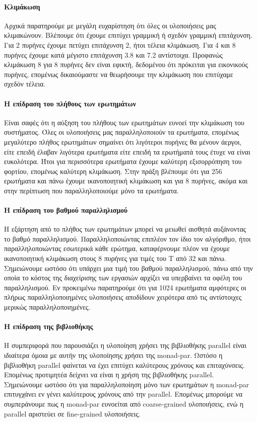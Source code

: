 \documentclass[titlepage]{article}
\begin{document}
\paragraph{Κλιμάκωση}

Αρχικά παρατηρούμε με μεγάλη ευχαρίστηση ότι όλες οι υλοποιήσεις μας κλιμακώνουν. Βλέπουμε ότι έχουμε επιτύχει γραμμική ή σχεδόν γραμμική επιτάχυνση. Για 2 πυρήνες έχουμε πετύχει επιτάχυνση 2, ήτοι τέλεια κλιμάκωση. Για 4 και 8 πυρήνες έχουμε κατά μέγιστο επιτάχυνση 3.8 και 7.2 αντίστοιχα. Προφανώς κλιμάκωση 8 για 8 πυρήνες δεν είναι εφικτή, δεδομένου ότι πρόκειται για εικονικούς πυρήνες, επομένως δικαιούμαστε να θεωρήσουμε την κλιμάκωση που επιτύχαμε σχεδόν τέλεια.

\paragraph{Η επίδραση του πλήθους των ερωτημάτων}

Είναι σαφές ότι η αύξηση του πλήθους των ερωτημάτων ευνοεί την κλιμάκωση του συστήματος. Όλες οι υλοποιήσεις μας παραλληλοποιούν τα ερωτήματα, επομένως μεγαλύτερο πλήθος ερωτημάτων σημαίνει ότι λιγότεροι πυρήνες θα μένουν άεργοι, είτε επειδή έλαβαν λιγότερα ερωτήματα είτε επειδή τα ερωτήματά τους έτυχε να είναι ευκολότερα. Ήτοι για περισσότερα ερωτήματα έχουμε καλύτερη εξισορρόπηση του φορτίου, επομένως καλύτερη κλιμάκωση. Στην πράξη βλέπουμε ότι για 256 ερωτήματα και πάνω έχουμε ικανοποιητική κλιμάκωση και για 8 πυρήνες, ακόμα και στην περίπτωση που παραλληλοποιούμε μόνο τα ερωτήματα.

\paragraph{Η επίδραση του βαθμού παραλληλισμού}

Η εξάρτηση από το πλήθος των ερωτημάτων μπορεί να μειωθεί αισθητά αυξάνοντας το βαθμό παραλληλισμού. Παραλληλοποιώντας επιπλέον τον ίδιο τον αλγόριθμο, ήτοι παραλληλοποιώντας εσωτερικά κάθε ερώτημα, καταφέρνουμε πλέον να έχουμε ικανοποιητική κλιμάκωση στους 8 πυρήνες για τιμές του T από 32 και πάνω. Σημειώνουμε ωστόσο ότι υπάρχει μια τιμή του βαθμού παραλληλισμού, πάνω από την οποία το κόστος της διαχείρισης των εργασιών αρχίζει να υπερβαίνει τα οφέλη του παραλληλισμού. Εν προκειμένω παρατηρούμε ότι για 1024 ερωτήματα αμφότερες οι πλήρως παραλληλοποιημένες υλοποιήσεις αποδίδουν χειρότερα από τις αντίστοιχες μερικώς παραλληλοποιημένες.

\paragraph{Η επίδραση της βιβλιοθήκης}

Η συμπεριφορά που παρουσιάζει η υλοποίηση χρήσει της βιβλιοθήκης parallel είναι ιδιαίτερα όμοια με αυτήν της υλοποίησης χρήσει της monad-par. Ωστόσο η βιβλιοθήκη parallel φαίνεται να έχει επιτύχει καλύτερους χρόνους και επιταχύνσεις. Επομένως προτιμητέα δείχνει να είναι η χρήση της βιβλιοθήκης parallel. Σημειώνουμε ωστόσο ότι για παραλληλοποίηση μόνο των ερωτημάτων η monad-par επιτυγχάνει εν γένει καλύτερους χρόνους από την parallel. Επομένως μπορούμε να συμπεράνουμε πως η monad-par ευνοείται από coarse-grained υλοποιήσεις, ενώ η parallel αριστεύει σε fine-grained υλοποιήσεις.
\end{document}
